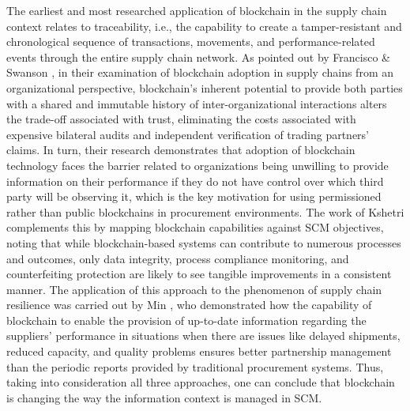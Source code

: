 \documentclass[11pt]{article}
\begin{document}
The earliest and most researched application of blockchain in the supply chain context relates to traceability, i.e., the capability to create a tamper-resistant and chronological sequence of transactions, movements, and performance-related events through the entire supply chain network. As pointed out by Francisco \& Swanson \cite{ref52}, in their examination of blockchain adoption in supply chains from an organizational perspective, blockchain's inherent potential to provide both parties with a shared and immutable history of inter-organizational interactions alters the trade-off associated with trust, eliminating the costs associated with expensive bilateral audits and independent verification of trading partners' claims. In turn, their research demonstrates that adoption of blockchain technology faces the barrier related to organizations being unwilling to provide information on their performance if they do not have control over which third party will be observing it, which is the key motivation for using permissioned rather than public blockchains in procurement environments. The work of Kshetri \cite{ref53} complements this by mapping blockchain capabilities against SCM objectives, noting that while blockchain-based systems can contribute to numerous processes and outcomes, only data integrity, process compliance monitoring, and counterfeiting protection are likely to see tangible improvements in a consistent manner. The application of this approach to the phenomenon of supply chain resilience was carried out by Min \cite{ref58}, who demonstrated how the capability of blockchain to enable the provision of up-to-date information regarding the suppliers' performance in situations when there are issues like delayed shipments, reduced capacity, and quality problems ensures better partnership management than the periodic reports provided by traditional procurement systems. Thus, taking into consideration all three approaches, one can conclude that blockchain is changing the way the information context is managed in SCM.
\end{document}
